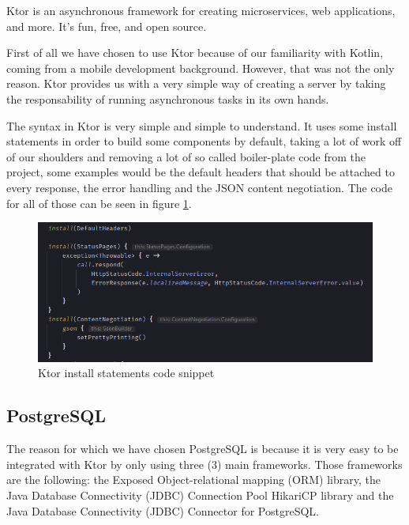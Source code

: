 \par Ktor is an asynchronous framework for creating microservices, web applications, and more. It’s fun, free, and open source. \cite{ktor}

First of all we have chosen to use Ktor because of our familiarity with Kotlin, coming from a mobile development background. However, that was not the only reason. Ktor provides us with a very simple way of creating a server by taking the responsability of running asynchronous tasks in its own hands.

The syntax in Ktor is very simple and simple to understand. It uses some install statements in order to build some components by default, taking a lot of work off of our shoulders and removing a lot of so called boiler-plate code from the project, some examples would be the default headers that should be attached to every response, the error handling and the JSON content negotiation. The code for all of those can be seen in figure \ref{fig:install-statements}.

\begin{figure}
\centering
\includegraphics[width=\textwidth]{figures/install_statements_snippet.png}
\caption{Ktor install statements code snippet}
\label{fig:install-statements}
\end{figure}

\subsection{PostgreSQL}
\label{subsec:ch3sec2subsec2}

\par The reason for which we have chosen PostgreSQL is because it is very easy to be integrated with Ktor by only using three (3) main frameworks. Those frameworks are the following: the Exposed Object-relational mapping (ORM) library, the Java Database Connectivity (JDBC) Connection Pool HikariCP library and the Java Database Connectivity (JDBC) Connector for PostgreSQL.

